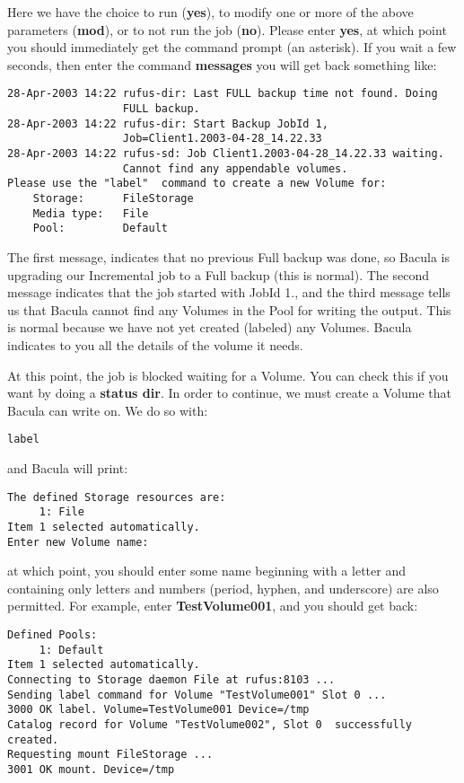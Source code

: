 {{Here we have the choice to run ({\bf yes}), to modify one or more of the above
parameters ({\bf mod}), or to not run the job ({\bf no}). Please enter {\bf
yes}, at which point you should immediately get the command prompt (an
asterisk). If you wait a few seconds, then enter the command {\bf messages}
you will get back something like: 

\footnotesize
\begin{verbatim}
28-Apr-2003 14:22 rufus-dir: Last FULL backup time not found. Doing
                  FULL backup.
28-Apr-2003 14:22 rufus-dir: Start Backup JobId 1,
                  Job=Client1.2003-04-28_14.22.33
28-Apr-2003 14:22 rufus-sd: Job Client1.2003-04-28_14.22.33 waiting.
                  Cannot find any appendable volumes.
Please use the "label"  command to create a new Volume for:
    Storage:      FileStorage
    Media type:   File
    Pool:         Default
\end{verbatim}
\normalsize

The first message, indicates that no previous Full backup was done, so Bacula
is upgrading our Incremental job to a Full backup (this is normal). The second
message indicates that the job started with JobId 1., and the third message
tells us that Bacula cannot find any Volumes in the Pool for writing the
output. This is normal because we have not yet created (labeled) any Volumes.
Bacula indicates to you all the details of the volume it needs. 

At this point, the job is blocked waiting for a Volume. You can check this if
you want by doing a {\bf status dir}. In order to continue, we must create a
Volume that Bacula can write on. We do so with: 

\footnotesize
\begin{verbatim}
label
\end{verbatim}
\normalsize

and Bacula will print: 

\footnotesize
\begin{verbatim}
The defined Storage resources are:
     1: File
Item 1 selected automatically.
Enter new Volume name:
\end{verbatim}
\normalsize

at which point, you should enter some name beginning with a letter and
containing only letters and numbers (period, hyphen, and underscore) are also
permitted. For example, enter {\bf TestVolume001}, and you should get back: 

\footnotesize
\begin{verbatim}
Defined Pools:
     1: Default
Item 1 selected automatically.
Connecting to Storage daemon File at rufus:8103 ...
Sending label command for Volume "TestVolume001" Slot 0 ...
3000 OK label. Volume=TestVolume001 Device=/tmp
Catalog record for Volume "TestVolume002", Slot 0  successfully created.
Requesting mount FileStorage ...
3001 OK mount. Device=/tmp
\end{verbatim}
\normalsize

}}
